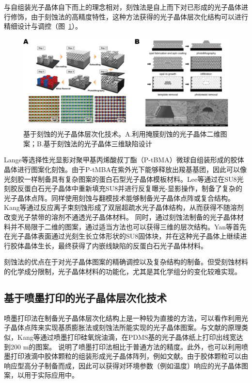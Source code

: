 与自组装光子晶体自下而上的理念相对，刻蚀法是自上而下对已形成的光子晶体进行修饰，由于刻蚀法的高精度特性，这种方法获得的光子晶体层次化结构可以进行精细设计与调控（图~\ref{fig:etch-pattern}）。
\begin{figure}[htbp]
	\centering
	\includegraphics[width=0.9\linewidth]{figures/etch-pattern.png}
	\caption{基于刻蚀的光子晶体层次化技术。A.利用掩膜刻蚀的光子晶体二维图案\cite{Lee2006Pixellated}；B.基于刻蚀法的光子晶体三维缺陷设计\cite{Yan2005Line}}
	\label{fig:etch-pattern}
\end{figure}
Lange等选择性光显影对聚甲基丙烯酸叔丁酯（P-tBMA）微球自组装形成的胶体晶体进行图案化刻蚀\cite{Lange2004Photoprocessable}。由于P-tMBA在紫外光下能够释放出羧基基团，因此可以像光刻胶一样制备具有复杂图案的蛋白石型光子晶体模板材料。Lee等通过在SU8光刻胶反蛋白石光子晶体中重新填充SU8并进行反复曝光-显影操作，制备了复杂的光子晶体点阵\cite{Lee2006Pixellated}。同样使用刻蚀与翻模技术能够制备光子晶体点阵或复合结构\cite{Ding2011Patterning,Lee2014Controlled}。
Kang等通过反应离子束刻蚀形成了双层超疏水光子晶体结构，从而获得不随溶剂改变光子禁带的溶剂不通透光子晶体材料\cite{Kang2014LiquidImpermeable}。
同时，通过刻蚀法制备的光子晶体材料并不局限于二维的图案，通过适当方法也可以获得三维的层次结构。Yan等首先在光子晶体表面通过光刻生长立体形状的SU8固体块，并在这种光子晶体上继续进行胶体晶体生长，最终获得了内嵌线缺陷的反蛋白石光子晶体材料\cite{Yan2005Line}。

刻蚀法的优点在于对光子晶体图案的精确调控以及复杂结构的制备。但受刻蚀材料的化学成分限制，光子晶体材料的功能化，尤其是其化学组分的变化较难实现。

\subsection{基于喷墨打印的光子晶体层次化技术}
\label{subsec:inkjet-pattern}

喷墨打印法在制备光子晶体层次化结构上是一种较为直接的方法，可以看作利用光子晶体点阵来实现基质膨胀法或刻蚀法所能实现的光子晶体图案。与文献的原理类似，Kang等通过喷墨打印硅氧烷油滴，在PDMS基的光子晶体纸上打印出线宽达到200 \text{$\mu$}m的图案\cite{Kang2011High}。
说明了喷墨打印法相比于普通方法的精度。此外，也可以利用喷墨打印液滴中胶体颗粒的组装形成光子晶体阵列，例如文献。由于胶体颗粒可以由响应型高分子制备而成，因此可以获得对环境参数（例如温度）响应的光子晶体图案\cite{Wang2012Inkjet}，以用于实际应用中。


